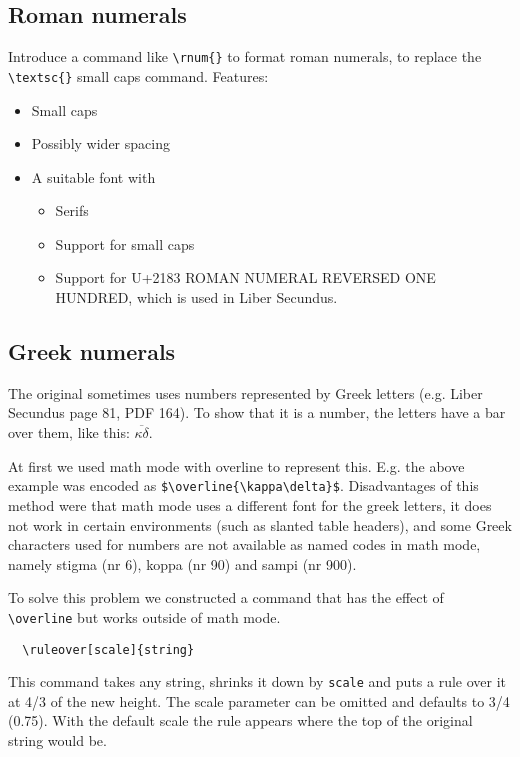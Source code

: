 \documentclass{report}
\begin{document}
\subsection{Roman numerals}
\label{subsec:roman_numerals}
Introduce a command like \verb+\rnum{}+ to format roman numerals, to replace
the \verb+\textsc{}+ small caps command. Features:
\begin{itemize}
\item Small caps
\item Possibly wider spacing
\item A suitable font with
\begin{itemize}
\item Serifs
\item Support for small caps
\item Support for U+2183 ROMAN NUMERAL REVERSED ONE HUNDRED, which is used
in Liber Secundus.
\end{itemize}

\end{itemize}

\subsection{Greek numerals}
\label{subsec:greek_numerals}
The original sometimes uses numbers represented by Greek letters
(e.g. Liber Secundus page 81, PDF 164). To show that it is a number, the
letters have a bar over them, like this: $\overline{\kappa\delta}$.

At first we used math mode with overline to represent this.
E.g. the above example was encoded as \verb+$\overline{\kappa\delta}$+.
Disadvantages of this method were that math mode uses a different
font for the greek letters,
it does not work in certain environments (such as slanted table headers),
and some Greek characters used for numbers are not available as named
codes in math mode, namely stigma (nr 6), koppa (nr 90) and sampi (nr 900).

To solve this problem we constructed a command that has the effect of
\verb+\overline+ but works outside of math mode.
\begin{verbatim}
  \ruleover[scale]{string}
\end{verbatim}
This command takes any string, shrinks it down by \verb+scale+ and
puts a rule over it at 4/3 of the new height.
The scale parameter can be omitted and defaults to 3/4 (0.75).
With the default scale the rule appears where the top of the original
string would be.
\end{document}
